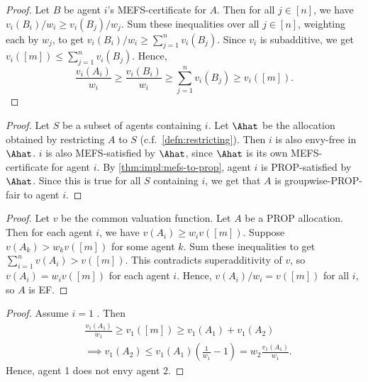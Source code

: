 \begin{proof}
Let $B$ be agent $i$'s MEFS-certificate for $A$.
Then for all $j \in [n]$, we have $v_i(B_i)/w_i \ge v_i(B_j)/w_j$.
Sum these inequalities over all $j \in [n]$, weighting each by $w_j$,
to get $v_i(B_i)/w_i \ge \sum_{j=1}^n v_i(B_j)$.
Since $v_i$ is subadditive, we get $v_i([m]) \le \sum_{j=1}^n v_i(B_j)$.
Hence,
\[ \frac{v_i(A_i)}{w_i} \ge \frac{v_i(B_i)}{w_i} \ge \sum_{j=1}^n v_i(B_j) \ge v_i([m]). \]
\end{proof}

\begin{proof}
Let $S$ be a subset of agents containing $i$.
Let $\Ahat$ be the allocation obtained by restricting $A$ to $S$ (c.f.~\cref{defn:restricting}).
Then $i$ is also envy-free in $\Ahat$.
$i$ is also MEFS-satisfied by $\Ahat$, since $\Ahat$ is its own MEFS-certificate for agent $i$.
By \cref{thm:impl:mefs-to-prop}, agent $i$ is PROP-satisfied by $\Ahat$.
Since this is true for all $S$ containing $i$,
we get that $A$ is groupwise-PROP-fair to agent $i$.
\end{proof}

\begin{proof}
Let $v$ be the common valuation function. Let $A$ be a PROP allocation.
Then for each agent $i$, we have $v(A_i) \ge w_iv([m])$.
Suppose $v(A_k) > w_kv([m])$ for some agent $k$.
Sum these inequalities to get $\sum_{i=1}^n v(A_i) > v([m])$.
This contradicts superadditivity of $v$, so $v(A_i) = w_iv([m])$ for each agent $i$.
Hence, $v(A_i)/w_i = v([m])$ for all $i$, so $A$ is EF.
\end{proof}

\begin{proof}
Assume $i=1$ \wLoG. Then
\begin{align*}
& \frac{v_1(A_1)}{w_1} \ge v_1([m]) \ge v_1(A_1) + v_1(A_2)
\\ &\implies v_1(A_2) \le v_1(A_1)\left(\frac{1}{w_1} - 1\right) = w_2 \frac{v_1(A_1)}{w_1}.
\end{align*}
Hence, agent 1 does not envy agent 2.
\end{proof}

